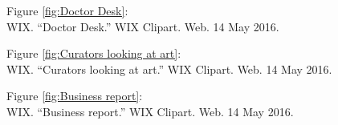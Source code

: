 \begin{imagescited}
\begin{flushleft}
Figure \ref{fig:Doctor Desk}: \\
\bibent
WIX. “Doctor Desk.” WIX Clipart. Web. 14 May 2016. \\ \vspace{3mm}

Figure \ref{fig:Curators looking at art}: \\
\bibent
WIX. “Curators looking at art.” WIX Clipart. Web. 14 May 2016. \\ \vspace{3mm}

Figure \ref{fig:Business report}: \\
\bibent
WIX. “Business report.” WIX Clipart. Web. 14 May 2016. \\ \vspace{3mm}

\end{flushleft}
\end{imagescited} 